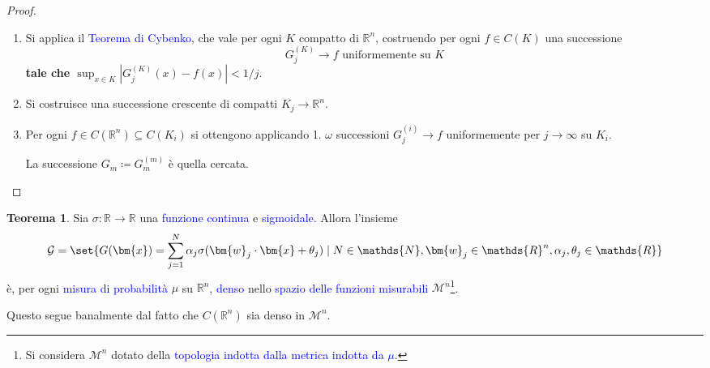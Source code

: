 \documentclass[10pt]{book}
\newcommand{\1}{\mathds{1}}
\newcommand{\R}{\mathds{R}}
\newcommand{\N}{\mathds{N}}
\theoremstyle{definition}%
\newtheorem{thm}{Teorema}[section]
\theoremstyle{plain}
\theoremstyle{remark}
\renewcommand{\href}[2]{\textcolor{blue}{#2}}
\begin{document}
\begin{proof}
\begin{enumerate}
\item Si applica il \href{../../../../../org/roam/20250706121659-ohldn_f_continue.org}{Teorema di Cybenko}, che vale per ogni \(K\) compatto di \(\R^{n}\), costruendo per ogni \(f \in C(K)\) una successione
\begin{equation*}
 G_{j}^{(K)}\to f\text{ uniformemente su }K
\end{equation*}
\textbf{\textbf{tale che \(\sup_{x \in K}|G_{j}^{(K)}(x)-f(x)|<1/j\)}}.
\item Si costruisce una successione crescente di compatti \(K_{j}\to \R^{n}\).
\item Per ogni \(f \in C(\R^{n}) \subseteq C(K_{i})\) si ottengono applicando 1. \(\omega\) successioni \(G_{j}^{(i)}\to f\) uniformemente per \(j\to \infty\) su \(K_{i}\).

La successione \(G_{m}\coloneqq G_{m}^{(m)}\) è quella cercata.
\end{enumerate}
\end{proof}
\begin{thm}
Sia \(\sigma:\R\to\R\) una \href{../../../../../org/roam/20250202170607-classe_relazione_binaria.org}{funzione} \href{../../../../../org/roam/20250103103252-funzione_continua.org}{continua} e \href{../../../../../org/roam/20250625110110-funzione_sigmoidale.org}{sigmoidale}. Allora l'insieme
\begin{equation*}
\mathcal{G} =\set{
G(\bm{x}) = \sum_{j=1}^{N}\alpha_{j}\sigma(\bm{w}_{j}\cdot \bm{x} + \theta_{j})\mid N \in \N, \bm{w}_{j} \in \R^{n}, \alpha_{j},\theta_{j} \in \R
}
\end{equation*}
è, per ogni \href{../../../../../org/roam/20250704105515-misura_di_probabilita.org}{misura di probabilità} \(\mu\) su \(\R^{n}\), \href{../../../../../org/roam/20250301193045-sottoinsieme_denso.org}{denso} nello \href{../../../../../org/roam/20250704104947-funzione_misurabile.org}{spazio delle funzioni misurabili} \(\mathcal{M}^{n}\)\footnote{Si considera \(\mathcal{M}^{n}\) dotato della \href{../../../../../org/roam/20250103145124-topologia.org}{topologia} \href{../../../../../org/roam/20250301193530-topologia_indotta_da_una_distanza.org}{indotta dalla metrica} \href{../../../../../org/roam/20250704104537-spazio_delle_funzioni_misurabili_come_spazio_metrico.org}{indotta da \(\mu\)}.}.
\label{thm9.3.24}
\end{thm}

Questo segue banalmente dal fatto che \(C(\R^{n})\) sia denso in \(\mathcal{M}^{n}\).
\end{document}
